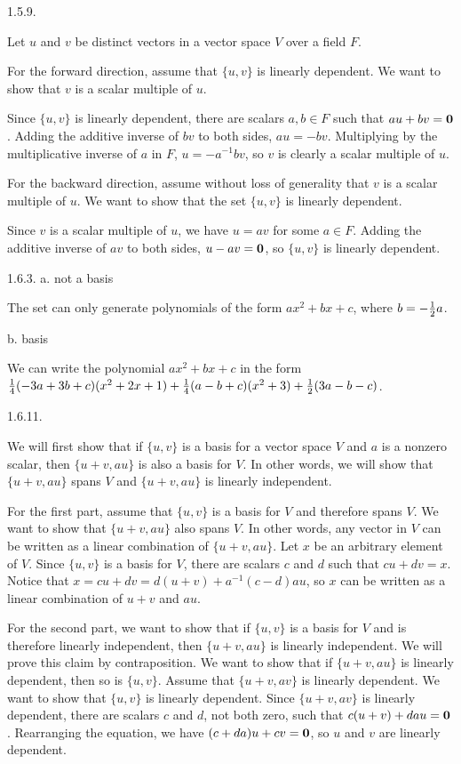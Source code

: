 \item{1.5.9.}

Let $u$ and $v$ be distinct vectors in a vector space $V$ over a field $F$.

For the forward direction, assume that $\{u,v\}$ is linearly dependent.
We want to show that $v$ is a scalar multiple of $u$.

Since $\{u,v\}$ is linearly dependent, there are scalars $a,b \in F$
such that $au + bv = {\bf 0}$.
Adding the additive inverse of $bv$ to both sides, $au = -bv$.
Multiplying by the multiplicative inverse of $a$ in $F$, $u = -a^{-1}bv$,
so $v$ is clearly a scalar multiple of $u$.

For the backward direction, assume without loss of generality that $v$ is
a scalar multiple of $u$.
We want to show that the set $\{u,v\}$ is linearly dependent.

Since $v$ is a scalar multiple of $u$, we have $u = av$ for some $a \in F$.
Adding the additive inverse of $av$ to both sides, $u - av = {\bf 0}$,
so $\{u,v\}$ is linearly dependent.

\item{1.6.3.} a. not a basis

The set can only generate polynomials of the form $ax^2 + bx + c$,
where $b = -{1 \over 2}a$.

\item{} b. basis

We can write the polynomial $ax^2 + bx + c$ in the form
${1 \over 4}(-3a + 3b + c)(x^2 + 2x + 1) +
{1 \over 4}(a - b + c)(x^2 + 3) + {1 \over 2}(3a - b - c)$.

\item{1.6.11.}

We will first show that if $\{u,v\}$ is a basis for a vector space $V$
and $a$ is a nonzero scalar, then $\{u+v,au\}$ is also a basis for $V$.
In other words, we will show that $\{u+v,au\}$ spans $V$
and $\{u+v,au\}$ is linearly independent.

For the first part, assume that $\{u,v\}$ is a basis for $V$
and therefore spans $V$.
We want to show that $\{u+v,au\}$ also spans $V$.
In other words, any vector in $V$
can be written as a linear combination of $\{u+v,au\}$.
Let $x$ be an arbitrary element of $V$.
Since $\{u,v\}$ is a basis for $V$,
there are scalars $c$ and $d$ such that $cu + dv = x$.
Notice that $x = cu + dv = d(u + v) + a^{-1}(c - d)au$, so
$x$ can be written as a linear combination of $u + v$ and $au$.

For the second part, we want to show that if $\{u,v\}$
is a basis for $V$ and is therefore linearly independent,
then $\{u+v,au\}$ is linearly independent.
We will prove this claim by contraposition.
We want to show that if $\{u+v,au\}$ is linearly dependent,
then so is $\{u,v\}$.
Assume that $\{u+v,av\}$ is linearly dependent.
We want to show that $\{u,v\}$ is linearly dependent.
Since $\{u+v,av\}$ is linearly dependent,
there are scalars $c$ and $d$, not both zero,
such that $c(u + v) + dau = {\bf 0}$.
Rearranging the equation, we have $(c + da)u + cv = {\bf 0}$,
so $u$ and $v$ are linearly dependent.

